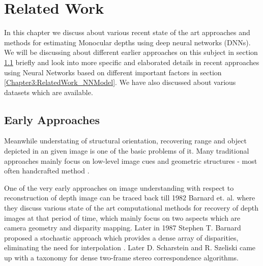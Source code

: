 
\chapter{Related Work} %

\label{Chapter3:RelatedWork} %

In this chapter we discuss about various recent state of the art approaches and methods for estimating Monocular depths using deep neural networks (DNNs). We will be discussing about different earlier approaches on this subject in section \ref{Chapter3:RelatedWork_EarlyApproach} briefly and look into more specific and elaborated details in recent approaches using Neural Networks based on different important factors in section \ref{Chapter3:RelatedWork_NNModel}. We have also discussed about various datasets which are available. 

\section{Early Approaches}
\label{Chapter3:RelatedWork_EarlyApproach}
Meanwhile understating of structural orientation, recovering range and object depicted in an given image is one of the basic problems of it. Many traditional approaches mainly focus on low-level image cues and geometric structures - most often handcrafted method \cite{torralba2002depth, pentland1987new,lai1992generalized,saxena2006learning}.
 
One of the very early approaches on image understanding with respect to reconstruction of depth image can be traced back till 1982 Barnard et. al. \cite{barnard1982computational} where they discuss various state of the art  computational methods for recovery of depth images at that period of time, which mainly focus on two aspects which are camera geometry and disparity mapping. Later in 1987 Stephen T. Barnard proposed a stochastic approach which provides a dense array of disparities, eliminating the need for interpolation \cite{barnard1987stochastic}. Later D. Scharstein and R. Szeliski \cite{scharstein2002taxonomy} came up with a taxonomy for dense two-frame stereo correspondence algorithms.\\

